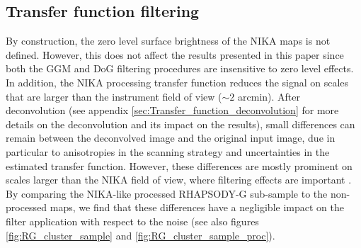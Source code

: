 \documentclass[twocolumn,traditabstract]{aa}
\begin{document}
\subsection{Transfer function filtering}\label{sec:Transfer_function_filtering}
By construction, the zero level surface brightness of the NIKA maps is not defined. However, this does not affect the results presented in this paper since both the GGM and DoG filtering procedures are insensitive to zero level effects. In addition, the NIKA processing transfer function reduces the signal on scales that are larger than the instrument field of view ($\sim 2$ arcmin). After deconvolution (see appendix \ref{sec:Transfer_function_deconvolution} for more details on the deconvolution and its impact on the results), small differences can remain between the deconvolved image and the original input image, due in particular to anisotropies in the scanning strategy and uncertainties in the estimated transfer function. However, these differences are mostly prominent on scales larger than the NIKA field of view, where filtering effects are important \citep{Adam2015}. By comparing the NIKA-like processed RHAPSODY-G sub-sample to the non-processed maps, we find that these differences have a negligible impact on the filter application with respect to the noise (see also figures \ref{fig:RG_cluster_sample} and \ref{fig:RG_cluster_sample_proc}).

\end{document}
